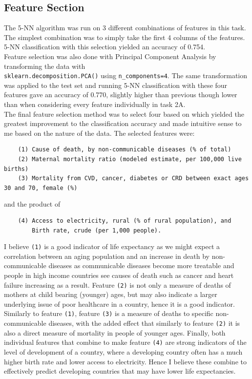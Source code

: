 \documentclass{article}
\begin{document}
\subsection*{Feature Section}
The 5-NN algorithm was run on 3 different combinations of features in this task. The simplest combination was to simply take the first 4 columns of the features. 5-NN classification with this selection yielded an accuracy of 0.754.\\[2mm]
Feature selection was also done with Principal Component Analysis by transforming the data with\\\verb|sklearn.decomposition.PCA()| using \verb|n_components=4|. The same transformation was applied to the test set and running 5-NN classification with these four features gave an accuracy of 0.770, slightly higher than previous though lower than when considering every feature individually in task 2A.\\[2mm]
The final feature selection method was to select four based on which yielded the greatest improvement to the classification accuracy and made intuitive sense to me based on the nature of the data. The selected features were: \begin{verbatim}
    (1) Cause of death, by non-communicable diseases (% of total)
    (2) Maternal mortality ratio (modeled estimate, per 100,000 live births)
    (3) Mortality from CVD, cancer, diabetes or CRD between exact ages 30 and 70, female (%)
\end{verbatim}
and the product of\begin{verbatim}
    (4) Access to electricity, rural (% of rural population), and
        Birth rate, crude (per 1,000 people).
\end{verbatim}
I believe \verb|(1)| is a good indicator of life expectancy as we might expect a correlation between an aging population and an increase in death by non-communicable diseases as communicable diseases become more treatable and people in high income countries see causes of death such as cancer and heart failure increasing as a result. Feature \verb|(2)| is not only a measure of deaths of mothers at child bearing (younger) ages, but may also indicate a larger underlying issue of poor healthcare in a country, hence it is a good indicator. Similarly to feature \verb|(1)|, feature \verb|(3)| is a measure of deaths to specific non-communicable diseases, with the added effect that similarly to feature \verb|(2)| it is also a direct measure of mortality in people of younger ages. Finally, both individual features that combine to make feature \verb|(4)| are strong indicators of the level of development of a country, where a developing country often has a much higher birth rate and lower access to electricity. Hence I believe these combine to effectively predict developing countries that may have lower life expectancies.\\[2mm]
\end{document}

